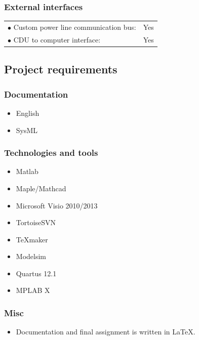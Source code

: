 \subsubsection{External interfaces}
\begin{table}[H]
\begin{tabular}{p{8cm} p{2cm}}
$\bullet$ Custom power line communication bus: & Yes\\
$\bullet$ CDU to computer interface: & Yes\\
\end{tabular}
\end{table}

\subsection{Project requirements}

\subsubsection{Documentation}
\begin{itemize}
\item English
\item SysML
\end{itemize}

\subsubsection{Technologies and tools}
\begin{itemize}
\item Matlab
\item Maple/Mathcad
\item Microsoft Visio 2010/2013
\item TortoiseSVN
\item TeXmaker
\item Modelsim
\item Quartus 12.1
\item MPLAB X
\end{itemize}

\subsubsection{Misc}
\begin{itemize}
\item Documentation and final assignment is written in LaTeX.
\end{itemize}

